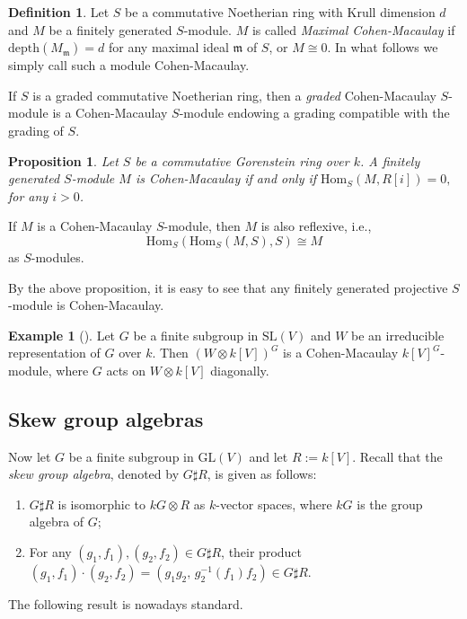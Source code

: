 \documentclass[11pt,reqno]{amsart}
\newtheorem{proposition}[theorem]{Proposition}
\theoremstyle{definition}
\newtheorem{example}[theorem]{Example}
\newtheorem{definition}[theorem]{Definition}
\begin{document}
\begin{definition}
Let $S$ be a commutative Noetherian ring with Krull 
dimension $d$ and $M$ be a finitely generated $S$-module.
$M$ is called {\it Maximal Cohen-Macaulay} if 
$\mathrm{depth}(M_{\mathfrak{m}}) = d$
for any maximal ideal $\mathfrak{m}$ of $S$, 
or $M \cong 0$. 
In what follows we simply call such
a module Cohen-Macaulay. 

If $S$ is a graded commutative Noetherian ring, 
then a {\it graded} Cohen-Macaulay $S$-module is a 
Cohen-Macaulay $S$-module endowing a grading 
compatible with the grading of $S$. 
\end{definition}

\begin{proposition}
Let $S$ be a commutative Gorenstein ring over $k$. A finitely 
generated $S$-module $M$
is Cohen-Macaulay if and only if
$
\mathrm{Hom}_{S}(M, R[i]) = 0,
$
for any $i > 0$.
\end{proposition}
If $M$ is a Cohen-Macaulay $S$-module, then $M$ is also reflexive, i.e., 
$$
\mathrm{Hom}_{S}(\mathrm{Hom}_{S}(M, S), S) \cong M
$$ 
as $S$-modules.

By the above proposition, it is easy to see that any finitely generated
projective $S$-module is Cohen-Macaulay.

\begin{example}[\cite{IT}]
Let $G$ be a finite subgroup in $\mathrm{SL}(V)$ and
$W$ be an irreducible representation of $G$ over $k$. 
Then $(W \otimes k[V])^{G}$ is a Cohen-Macaulay 
$k[V]^{G}$-module, where $G$ acts on $W \otimes k[V]$ diagonally. 
\end{example}


\subsection{Skew group algebras}\label{NCSC}

Now let $G$ be a finite subgroup in $\mathrm{GL}(V)$ and let $R:=k[V]$. 
Recall that the {\it skew group algebra}, denoted by $G\sharp R$, is given
as follows:
\begin{enumerate}
\item[(1)] $G\sharp R$ is isomorphic to $kG \otimes R$ as $k$-vector spaces, 
where $kG$ is the group algebra of $G$; 

\item[(2)] For any $(g_{1}, f_1), (g_{2}, f_2) \in G\sharp R$,
their product
$
(g_{1}, f_1)\cdot (g_{2}, f_2) = (g_{1}g_{2}, 
\, g_{2}^{-1} (f_1) f_{2}) \in G\sharp R
$. 
\end{enumerate}
The following result is nowadays standard.
\end{document}
